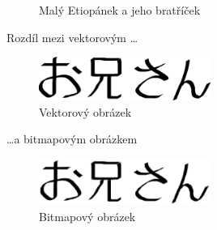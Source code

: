 \documentclass[11pt]{article}
\theoremstyle{plain}
\theoremstyle{plain}
\begin{document}
\begin{figure}[h]
{         }
    \caption{Malý Etiopánek a jeho bratříček}
\end{figure}

Rozdíl mezi vektorovým \dots

\begin{figure}[h]
    \centering
    \includegraphics[width=0.5\textwidth]{oniisan.eps}
    \caption{Vektorový obrázek}
\end{figure}

\dots a bitmapovým obrázkem

\begin{figure}[h]
    \centering
    \includegraphics[width=0.5\textwidth]{oniisan2.eps}
    \caption{Bitmapový obrázek}
\end{figure}
\end{document}
